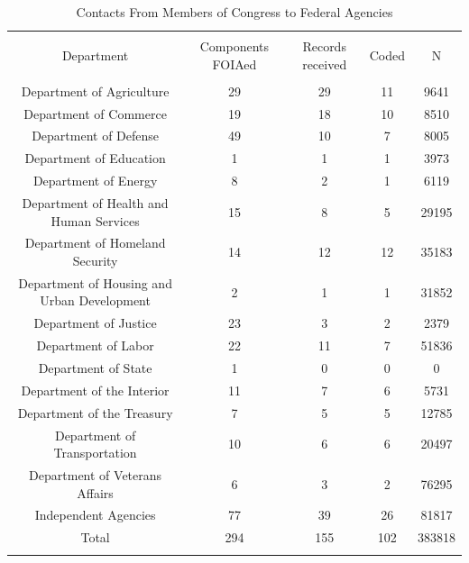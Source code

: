 
\begin{table}[!htbp] \centering 
  \caption{Contacts From Members of Congress to Federal Agencies} 
  \label{responserates} 
\begin{tabular}{@{\extracolsep{5pt}} ccccc} 
\\[-1.8ex]\hline \\[-1.8ex] 
Department & Components FOIAed & Records received & Coded & N \\ 
\hline \\[-1.8ex] 
Department of Agriculture & 29 & 29 & 11 & 9641 \\ 
Department of Commerce & 19 & 18 & 10 & 8510 \\ 
Department of Defense & 49 & 10 & 7 & 8005 \\ 
Department of Education & 1 & 1 & 1 & 3973 \\ 
Department of Energy & 8 & 2 & 1 & 6119 \\ 
Department of Health and Human Services & 15 & 8 & 5 & 29195 \\ 
Department of Homeland Security & 14 & 12 & 12 & 35183 \\ 
Department of Housing and Urban Development & 2 & 1 & 1 & 31852 \\ 
Department of Justice & 23 & 3 & 2 & 2379 \\ 
Department of Labor & 22 & 11 & 7 & 51836 \\ 
Department of State & 1 & 0 & 0 & 0 \\ 
Department of the Interior & 11 & 7 & 6 & 5731 \\ 
Department of the Treasury & 7 & 5 & 5 & 12785 \\ 
Department of Transportation & 10 & 6 & 6 & 20497 \\ 
Department of Veterans Affairs & 6 & 3 & 2 & 76295 \\ 
Independent Agencies & 77 & 39 & 26 & 81817 \\ 
Total & 294 & 155 & 102 & 383818 \\ 
\hline \\[-1.8ex] 
\end{tabular} 
\end{table} 
